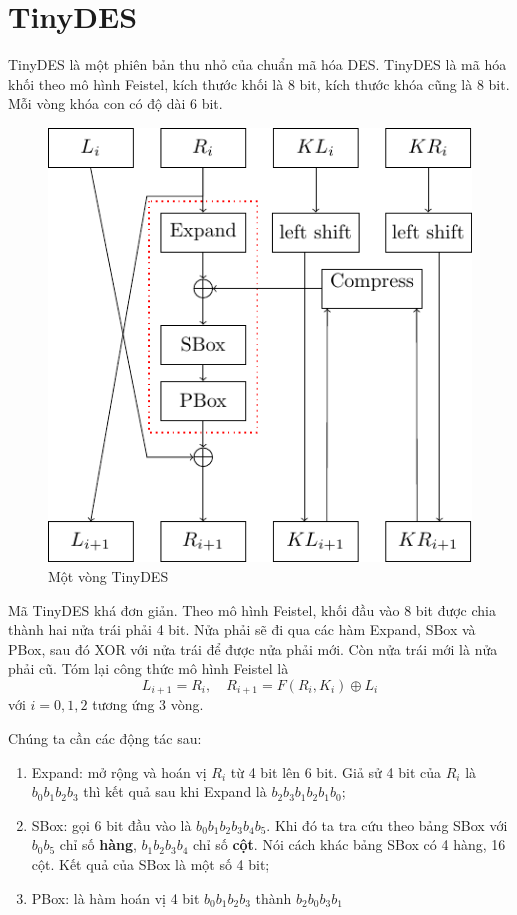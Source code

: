 \chapter{TinyDES}

TinyDES là một phiên bản thu nhỏ của chuẩn mã hóa DES. TinyDES
là mã hóa khối theo mô hình Feistel, kích thước khối là 8 bit, kích
thước khóa cũng là 8 bit. Mỗi vòng khóa con có độ dài 6 bit.

\begin{figure}[ht]
    \centering
    \includegraphics{TinyDES/blocky.pdf}
    \caption{Một vòng TinyDES}
\end{figure}

Mã TinyDES khá đơn giản. Theo mô hình Feistel, khối đầu vào 8 bit được chia thành
hai nửa trái phải 4 bit. Nửa phải sẽ đi qua các hàm Expand, SBox và PBox, sau đó
XOR với nửa trái để được nửa phải mới. Còn nửa trái mới là nửa phải cũ. Tóm lại 
công thức mô hình Feistel là
\[L_{i+1} = R_i, \quad R_{i+1} = F(R_i, K_i) \oplus L_i\]
với $i = 0, 1, 2$ tương ứng 3 vòng.

Chúng ta cần các động tác sau:

\begin{enumerate}
    \item Expand: mở rộng và hoán vị $R_i$ từ 4 bit lên 6 bit. Giả sử 4 bit
    của $R_i$ là $b_0 b_1 b_2 b_3$ thì kết quả sau khi Expand là $b_2 b_3 b_1
    b_2 b_1 b_0$;
    \item SBox: gọi 6 bit đầu vào là $b_0 b_1 b_2 b_3 b_4 b_5$. Khi đó ta tra
    cứu theo bảng SBox với $b_0 b_5$ chỉ số \textbf{hàng}, $b_1 b_2 b_3 b_4$ chỉ
    số \textbf{cột}. Nói cách khác bảng SBox có 4 hàng, 16 cột. Kết quả của SBox
    là một số 4 bit;
    \item PBox: là hàm hoán vị 4 bit $b_0 b_1 b_2 b_3$ thành $b_2 b_0 b_3 b_1$
\end{enumerate}

